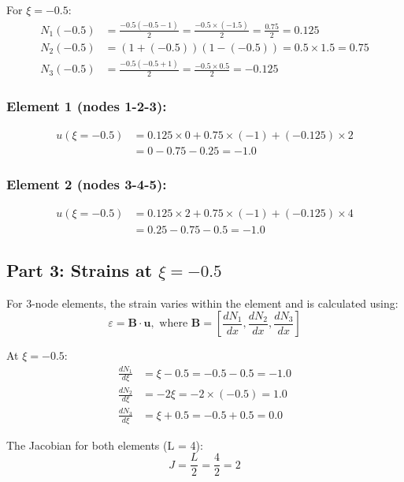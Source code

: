 \documentclass[12pt,a4paper]{article}
\begin{document}
For $\xi = -0.5$:
\begin{align}
N_1(-0.5) &= \frac{-0.5(-0.5-1)}{2} = \frac{-0.5 \times (-1.5)}{2} = \frac{0.75}{2} = 0.125 \\
N_2(-0.5) &= (1+(-0.5))(1-(-0.5)) = 0.5 \times 1.5 = 0.75 \\
N_3(-0.5) &= \frac{-0.5(-0.5+1)}{2} = \frac{-0.5 \times 0.5}{2} = -0.125
\end{align}

\subsubsection*{Element 1 (nodes 1-2-3):}
\begin{align}
u(\xi=-0.5) &= 0.125 \times 0 + 0.75 \times (-1) + (-0.125) \times 2 \\
&= 0 - 0.75 - 0.25 = -1.0
\end{align}

\subsubsection*{Element 2 (nodes 3-4-5):}
\begin{align}
u(\xi=-0.5) &= 0.125 \times 2 + 0.75 \times (-1) + (-0.125) \times 4 \\
&= 0.25 - 0.75 - 0.5 = -1.0
\end{align}

\subsection{Part 3: Strains at $\xi = -0.5$}
For 3-node elements, the strain varies within the element and is calculated using:
\begin{equation}
\varepsilon = \mathbf{B} \cdot \mathbf{u}, \text{ where } \mathbf{B} = \left[\frac{dN_1}{dx}, \frac{dN_2}{dx}, \frac{dN_3}{dx}\right]
\end{equation}

At $\xi = -0.5$:
\begin{align}
\frac{dN_1}{d\xi} &= \xi - 0.5 = -0.5 - 0.5 = -1.0 \\
\frac{dN_2}{d\xi} &= -2\xi = -2 \times (-0.5) = 1.0 \\
\frac{dN_3}{d\xi} &= \xi + 0.5 = -0.5 + 0.5 = 0.0
\end{align}

The Jacobian for both elements (L = 4):
\begin{equation}
J = \frac{L}{2} = \frac{4}{2} = 2
\end{equation}
\end{document}
